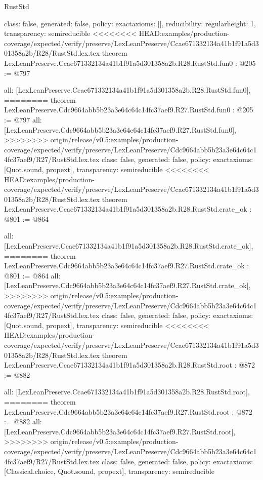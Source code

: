 \begin{lexlean}{RustStd}
\begin{coremodule}
{\begin{coremodule}
{{{  class: false,
  generated: false,
  policy: exact{axioms: []},
  reducibility: regular{height: 1},
  transparency: semireducible
}
<<<<<<<< HEAD:examples/production-coverage/expected/verify/preserve/LexLeanPreserve/Ccae671332134a41b1f91a5d301358a2b/R28/RustStd.lex.tex
theorem LexLeanPreserve.Ccae671332134a41b1f91a5d301358a2b.R28.RustStd.fun0 : @205 := @797 {
  all: [LexLeanPreserve.Ccae671332134a41b1f91a5d301358a2b.R28.RustStd.fun0],
========
theorem LexLeanPreserve.Cdc9664abb5b23a3e64c64c14fc37aef9.R27.RustStd.fun0 : @205 := @797 {
  all: [LexLeanPreserve.Cdc9664abb5b23a3e64c64c14fc37aef9.R27.RustStd.fun0],
>>>>>>>> origin/release/v0.5:examples/production-coverage/expected/verify/preserve/LexLeanPreserve/Cdc9664abb5b23a3e64c64c14fc37aef9/R27/RustStd.lex.tex
  class: false,
  generated: false,
  policy: exact{axioms: [Quot.sound, propext]},
  transparency: semireducible
}
<<<<<<<< HEAD:examples/production-coverage/expected/verify/preserve/LexLeanPreserve/Ccae671332134a41b1f91a5d301358a2b/R28/RustStd.lex.tex
theorem LexLeanPreserve.Ccae671332134a41b1f91a5d301358a2b.R28.RustStd.crate_ok : @801 := @864 {
  all: [LexLeanPreserve.Ccae671332134a41b1f91a5d301358a2b.R28.RustStd.crate_ok],
========
theorem LexLeanPreserve.Cdc9664abb5b23a3e64c64c14fc37aef9.R27.RustStd.crate_ok : @801 := @864 {
  all: [LexLeanPreserve.Cdc9664abb5b23a3e64c64c14fc37aef9.R27.RustStd.crate_ok],
>>>>>>>> origin/release/v0.5:examples/production-coverage/expected/verify/preserve/LexLeanPreserve/Cdc9664abb5b23a3e64c64c14fc37aef9/R27/RustStd.lex.tex
  class: false,
  generated: false,
  policy: exact{axioms: [Quot.sound, propext]},
  transparency: semireducible
}
<<<<<<<< HEAD:examples/production-coverage/expected/verify/preserve/LexLeanPreserve/Ccae671332134a41b1f91a5d301358a2b/R28/RustStd.lex.tex
theorem LexLeanPreserve.Ccae671332134a41b1f91a5d301358a2b.R28.RustStd.root : @872 := @882 {
  all: [LexLeanPreserve.Ccae671332134a41b1f91a5d301358a2b.R28.RustStd.root],
========
theorem LexLeanPreserve.Cdc9664abb5b23a3e64c64c14fc37aef9.R27.RustStd.root : @872 := @882 {
  all: [LexLeanPreserve.Cdc9664abb5b23a3e64c64c14fc37aef9.R27.RustStd.root],
>>>>>>>> origin/release/v0.5:examples/production-coverage/expected/verify/preserve/LexLeanPreserve/Cdc9664abb5b23a3e64c64c14fc37aef9/R27/RustStd.lex.tex
  class: false,
  generated: false,
  policy: exact{axioms: [Classical.choice, Quot.sound, propext]},
  transparency: semireducible
}

}}}}}
\end{coremodule}}
\end{coremodule}
\end{lexlean}
